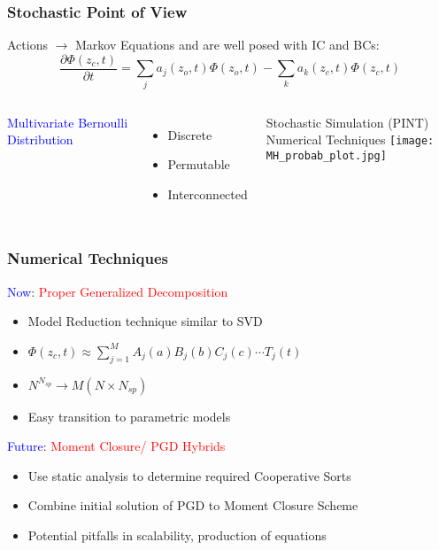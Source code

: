 
\begin{frame}
 \frametitle{Stochastic Point of View}
 Actions $\rightarrow$ Markov Equations and are well posed with IC and BCs:
    \[
\frac{\partial \Phi(z_c,t)}{\partial t} = \sum_j  a_j(z_o,t)\Phi(z_o,t) -\sum_k a_k(z_c,t)\Phi(z_c,t)
\]
\begin{columns}
 \textcolor{blue}{Multivariate Bernoulli Distribution}
 \begin{itemize}
  \item Discrete
  \item Permutable
  \item Interconnected
 \end{itemize}
 Stochastic Simulation (PINT)\\
 Numerical Techniques
  \texttt{[image: MH\_probab\_plot.jpg]}
\hfill
\end{columns}

\end{frame}


\begin{frame}
 \frametitle{Numerical Techniques}
 \textcolor{blue}{Now}: \textcolor{red}{Proper Generalized Decomposition}
 \begin{itemize}
 \item Model Reduction technique similar to SVD
  \item $\Phi(z_c,t) \approx \sum\limits^{M}_{j=1}A_j(a) B_j(b)  C_j(c)\cdots T_j(t)$
  \item $N^{N_{sp}}\rightarrow M\left( N\times N_{sp} \right)$
  \item Easy transition to parametric models
 \end{itemize}
 \vspace{1cm}
\textcolor{blue}{Future}: \textcolor{red}{Moment Closure/ PGD Hybrids}
\begin{itemize}
 \item Use static analysis to determine required Cooperative Sorts
 \item Combine initial solution of PGD to Moment Closure Scheme
 \item Potential pitfalls in scalability, production of equations
\end{itemize}


\end{frame}
